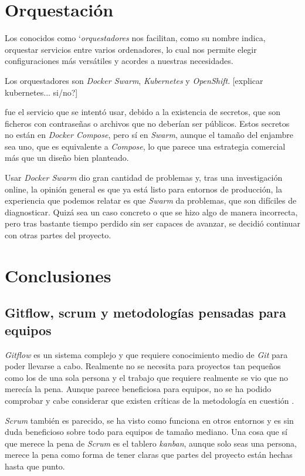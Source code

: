 \section{Orquestación}

Los conocidos como `\emph{orquestadores} nos facilitan, como su nombre indica, orquestar servicios entre varios ordenadores, lo cual nos permite elegir configuraciones más versátiles y acordes a nuestras necesidades. 

Los orquestadores son \emph{Docker Swarm}, \emph{Kubernetes} y \emph{OpenShift}. [explicar kubernetes... si/no?]

 fue el servicio que se intentó usar, debido a la existencia de secretos, que son ficheros con contraseñas o archivos que no deberían ser públicos. Estos secretos no están en \emph{Docker Compose}, pero sí en \emph{Swarm}, aunque el tamaño del enjambre sea uno, que es equivalente a \emph{Compose}, lo que parece una estrategia comercial más que un diseño bien planteado.

Usar \emph{Docker Swarm} dio gran cantidad de problemas y, tras una investigación online, la opinión general es que ya está listo para entornos de producción, la experiencia que podemos relatar es que \emph{Swarm} da problemas, que son difíciles de diagnosticar. Quizá sea un caso concreto o que se hizo algo de manera incorrecta, pero tras bastante tiempo perdido sin ser capaces de avanzar, se decidió continuar con otras partes del proyecto.


\section{Conclusiones}

\subsection{Gitflow, scrum y metodologías pensadas para equipos}

\emph{Gitflow} es un sistema complejo y que requiere conocimiento medio de \emph{Git} para poder llevarse a cabo. Realmente no se necesita para proyectos tan pequeños como los de una sola persona y el trabajo que requiere realmente se vio que no merecía la pena. Aunque parece beneficiosa para equipos, no se ha podido comprobar y cabe considerar que existen críticas de la metodología en cuestión \cite{gfharm}.

\emph{Scrum} también es parecido, se ha visto como funciona en otros entornos y es sin duda beneficioso sobre todo para equipos de tamaño mediano. Una cosa que sí que merece la pena de \emph{Scrum} es el tablero \emph{kanban}, aunque solo seas una persona, merece la pena como forma de tener claras que partes del proyecto están hechas hasta que punto.

